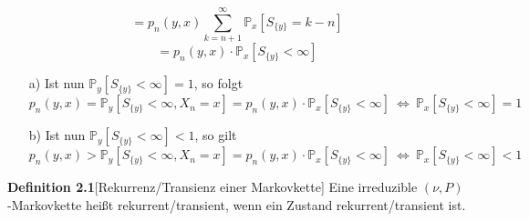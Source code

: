 \begin{equation*}
= p_{n}(y,x) \sum_{k=n+1}^{\infty}\mathbb{P}_{x}[S_{\lbrace y \rbrace} = k-n]
\end{equation*}
\begin{equation*}
 = p_{n}(y,x) \cdot \mathbb{P}_{x}[S_{\lbrace y \rbrace} < \infty]
\end{equation*}
\begin{itemize}
\item[a)] Ist nun $\mathbb{P}_{y}[S_{\lbrace y \rbrace} < \infty] = 1$, so folgt
\begin{equation*}
p_{n}(y,x) = \mathbb{P}_{y}[S_{\lbrace y \rbrace} < \infty, X_{n} = x] = p_{n}(y,x) \cdot \mathbb{P}_{x}[S_{\lbrace y \rbrace} < \infty] \: \Leftrightarrow \: \mathbb{P}_{x}[S_{\lbrace y \rbrace} < \infty] = 1 
\end{equation*}
\item[b)] Ist nun $\mathbb{P}_{y}[S_{\lbrace y \rbrace} < \infty] < 1$, so gilt
\begin{equation*}
p_{n}(y,x) > \mathbb{P}_{y}[S_{\lbrace y \rbrace} < \infty, X_{n} = x] = p_{n}(y,x) \cdot \mathbb{P}_{x}[S_{\lbrace y \rbrace} < \infty] \: \Leftrightarrow \: \mathbb{P}_{x}[S_{\lbrace y \rbrace} < \infty] < 1 
\end{equation*}
\end{itemize}

\textbf{Definition 2.1}[Rekurrenz/Transienz einer Markovkette]
Eine irreduzible $(\nu,P)$-Markovkette heißt rekurrent/transient, wenn ein Zustand rekurrent/transient ist.
